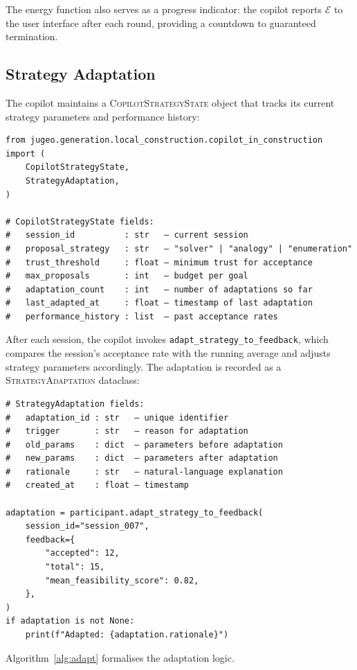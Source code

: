 \documentclass[11pt]{article}
\newcommand{\CSS}{\textsc{CopilotStrategyState}}
\newcommand{\SA}{\textsc{StrategyAdaptation}}
\newcommand{\energy}{\mathcal{E}}
\begin{document}
The energy function also serves as a progress indicator: the copilot
reports $\energy$ to the user interface after each round, providing
a countdown to guaranteed termination.

\subsection{Strategy Adaptation}\label{sec:neg-adaptation}

The copilot maintains a \CSS{} object that tracks its current
strategy parameters and performance history:

\begin{lstlisting}
from jugeo.generation.local_construction.copilot_in_construction import (
    CopilotStrategyState,
    StrategyAdaptation,
)

# CopilotStrategyState fields:
#   session_id          : str   — current session
#   proposal_strategy   : str   — "solver" | "analogy" | "enumeration"
#   trust_threshold     : float — minimum trust for acceptance
#   max_proposals       : int   — budget per goal
#   adaptation_count    : int   — number of adaptations so far
#   last_adapted_at     : float — timestamp of last adaptation
#   performance_history : list  — past acceptance rates
\end{lstlisting}

After each session, the copilot invokes
\texttt{adapt\_strategy\_to\_feedback}, which compares the session's
acceptance rate with the running average and adjusts strategy
parameters accordingly.  The adaptation is recorded as a
\SA{} dataclass:

\begin{lstlisting}
# StrategyAdaptation fields:
#   adaptation_id : str   — unique identifier
#   trigger       : str   — reason for adaptation
#   old_params    : dict  — parameters before adaptation
#   new_params    : dict  — parameters after adaptation
#   rationale     : str   — natural-language explanation
#   created_at    : float — timestamp

adaptation = participant.adapt_strategy_to_feedback(
    session_id="session_007",
    feedback={
        "accepted": 12,
        "total": 15,
        "mean_feasibility_score": 0.82,
    },
)
if adaptation is not None:
    print(f"Adapted: {adaptation.rationale}")
\end{lstlisting}

Algorithm~\ref{alg:adapt} formalises the adaptation logic.
\end{document}
